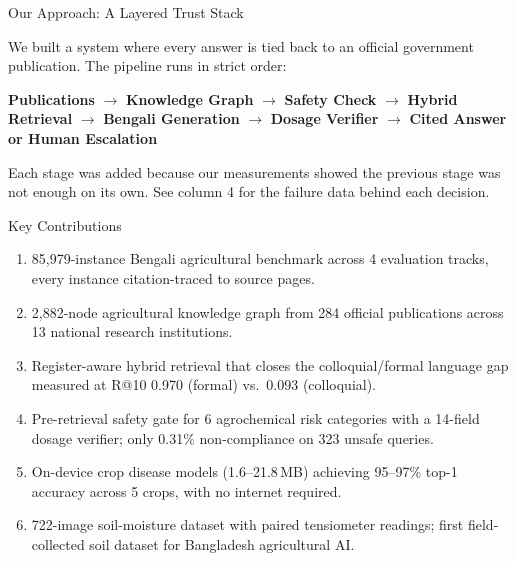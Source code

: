 \documentclass[final]{beamer}
\newlength{\colwidth}\setlength{\colwidth}{0.1796\paperwidth}
\newcommand{\Nbench}{85{,}979}
\newcommand{\Nnodes}{2{,}882}
\newcommand{\Npubs}{284}
\newcommand{\Ninst}{13}
\newcommand{\Rdensecolloq}{0.093}
\newcommand{\Rdenseformal}{0.970}
\newcommand{\NonCompliance}{0.31\%}
\begin{document}
\begin{frame}[t]
\begin{columns}[t]
\begin{column}{\colwidth}
  \begin{block}{Our Approach: A Layered Trust Stack}
    {\small We built a system where every answer is tied back to an official government
    publication. The pipeline runs in strict order:

    \vspace{0.5ex}
    \textbf{Publications} $\rightarrow$ \textbf{Knowledge Graph} $\rightarrow$
    \textbf{Safety Check} $\rightarrow$ \textbf{Hybrid Retrieval} $\rightarrow$
    \textbf{Bengali Generation} $\rightarrow$ \textbf{Dosage Verifier}
    $\rightarrow$ \textbf{Cited Answer or Human Escalation}

    \vspace{0.3ex}
    Each stage was added because our measurements showed the previous stage was not enough
    on its own. See column 4 for the failure data behind each decision.}
  \end{block}

  \begin{block}{Key Contributions}
    {\small
    \begin{enumerate}\setlength{\itemsep}{0.3ex}
      \item \Nbench-instance Bengali agricultural benchmark across 4 evaluation tracks,
            every instance citation-traced to source pages.
      \item \Nnodes-node agricultural knowledge graph from \Npubs{} official publications
            across \Ninst{} national research institutions.
      \item Register-aware hybrid retrieval that closes the colloquial/formal language gap
            measured at R@10 \Rdenseformal{} (formal) vs.\ \Rdensecolloq{} (colloquial).
      \item Pre-retrieval safety gate for 6 agrochemical risk categories with a 14-field
            dosage verifier; only \NonCompliance{} non-compliance on 323 unsafe queries.
      \item On-device crop disease models (1.6--21.8\,MB) achieving 95--97\% top-1 accuracy
            across 5 crops, with no internet required.
      \item 722-image soil-moisture dataset with paired tensiometer readings; first
            field-collected soil dataset for Bangladesh agricultural AI.
    \end{enumerate}}
  \end{block}


\end{column}
\end{columns}
\end{frame}
\end{document}
